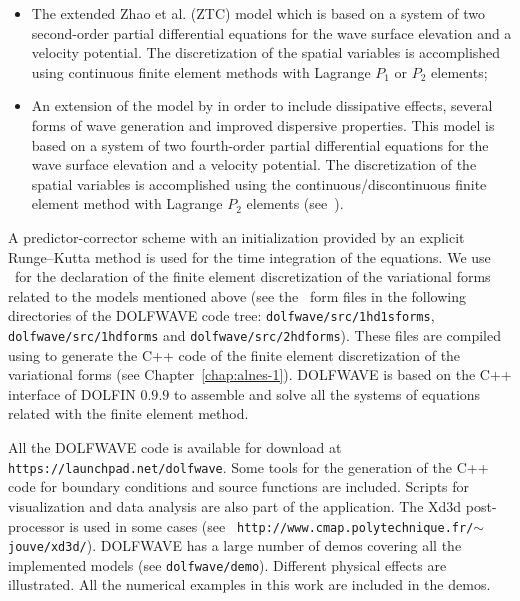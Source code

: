 \begin{itemize}
\item The extended Zhao et al. (ZTC) model which is based on
  a system of two second-order partial differential
  equations for the wave surface elevation and a velocity
  potential. The discretization of the spatial variables is
  accomplished using continuous finite element methods with
  Lagrange $P_1$ or $P_2$ elements;

 \item An extension of the model by \cite{ChenLiu1994} in
   order to include dissipative effects, several forms of
   wave generation and improved dispersive properties.  This
   model is based on a system of two fourth-order partial
   differential equations for the wave surface elevation and
   a velocity potential. The discretization of the spatial
   variables is accomplished using the
   continuous/discontinuous finite element method with
   Lagrange $P_2$ elements
   (see~\cite{LopesPereiraTrabucho}).
\end{itemize}

A predictor-corrector scheme with an initialization
provided by an explicit Runge--Kutta method is used for the
time integration of the equations. We use \ufl\ for the
declaration of the finite element discretization of the
variational forms related to the models mentioned above (see
the \ufl\ form files in the following directories of the
DOLFWAVE code tree: {\tt dolfwave/src/1hd1sforms}, {\tt
dolfwave/src/1hdforms} and {\tt dolfwave/src/2hdforms}).
These files are compiled using \ffc to generate the C++ code
of the finite element discretization of the variational
forms (see Chapter~\ref{chap:alnes-1}).  DOLFWAVE is based
on the C++ interface of DOLFIN $0.9.9$ to assemble and solve
all the systems of equations related with the finite element
method.

All the DOLFWAVE code is available for download at {\tt
https://launchpad.net/dolfwave}.  Some tools for the
generation of the C++ code for boundary conditions and
source functions are included. Scripts for visualization
and data analysis are also part of the application. The
Xd3d post-processor is used in some cases (see {\tt
http://www.cmap.polytechnique.fr/$\sim$jouve/xd3d/}).
DOLFWAVE has a large number of demos covering all the
implemented models (see {\tt dolfwave/demo}). Different
physical effects are illustrated.  All the numerical
examples in this work are included in the demos.

